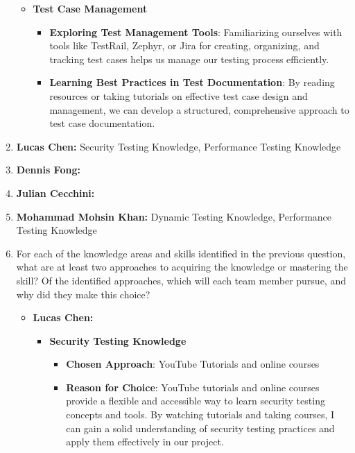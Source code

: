 \documentclass[12pt, titlepage]{article}
\begin{document}
\begin{enumerate}
\begin{itemize}
    \item \textbf{Test Case Management}
    \begin{itemize}
        \item \textbf{Exploring Test Management Tools}: Familiarizing ourselves with tools like TestRail, Zephyr, or Jira for creating, organizing, and tracking test cases helps us manage our testing process efficiently.
        \item \textbf{Learning Best Practices in Test Documentation}: By reading resources or taking tutorials on effective test case design and management, we can develop a structured, comprehensive approach to test case documentation.
    \end{itemize}

  \end{itemize}

  \item \textbf{Lucas Chen:} Security Testing Knowledge, Performance Testing Knowledge
  \item \textbf{Dennis Fong:}
  \item \textbf{Julian Cecchini:} 
  \item \textbf{Mohammad Mohsin Khan:} Dynamic Testing Knowledge, Performance Testing Knowledge

  \item For each of the knowledge areas and skills identified in the previous
  question, what are at least two approaches to acquiring the knowledge or
  mastering the skill?  Of the identified approaches, which will each team
  member pursue, and why did they make this choice?
  
  \begin{itemize}
    \item \textbf{Lucas Chen:} 
    \begin{itemize}
        \item \textbf{Security Testing Knowledge}  
        \begin{itemize}
            \item \textbf{Chosen Approach}: YouTube Tutorials and online courses
            \item \textbf{Reason for Choice}: YouTube tutorials and online courses provide a flexible and 
            accessible way to learn security testing concepts and tools. By watching tutorials and taking courses, 
            I can gain a solid understanding of security testing practices and apply them effectively in our project.
        \end{itemize}
    

\end{itemize}
\end{itemize}
\end{enumerate}
\end{document}
